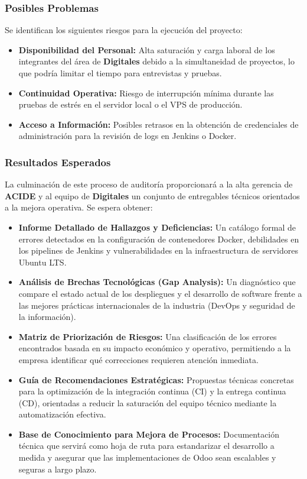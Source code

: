 \documentclass[12pt]{article}
\begin{document}
\subsubsection{Posibles Problemas}
Se identifican los siguientes riesgos para la ejecución del proyecto:
\begin{itemize}
    \item \textbf{Disponibilidad del Personal:} Alta saturación y carga laboral de los integrantes del área de \textbf{Digitales} debido a la simultaneidad de proyectos, lo que podría limitar el tiempo para entrevistas y pruebas.
    \item \textbf{Continuidad Operativa:} Riesgo de interrupción mínima durante las pruebas de estrés en el servidor local o el VPS de producción.
    \item \textbf{Acceso a Información:} Posibles retrasos en la obtención de credenciales de administración para la revisión de logs en Jenkins o Docker.
\end{itemize}

\subsubsection{Resultados Esperados}
La culminación de este proceso de auditoría proporcionará a la alta gerencia de \textbf{ACIDE} y al equipo de \textbf{Digitales} un conjunto de entregables técnicos orientados a la mejora operativa. Se espera obtener:
\begin{itemize}
    \item \textbf{Informe Detallado de Hallazgos y Deficiencias:} Un catálogo formal de errores detectados en la configuración de contenedores Docker, debilidades en los pipelines de Jenkins y vulnerabilidades en la infraestructura de servidores Ubuntu LTS.
    \item \textbf{Análisis de Brechas Tecnológicas (Gap Analysis):} Un diagnóstico que compare el estado actual de los despliegues y el desarrollo de software frente a las mejores prácticas internacionales de la industria (DevOps y seguridad de la información).
    \item \textbf{Matriz de Priorización de Riesgos:} Una clasificación de los errores encontrados basada en su impacto económico y operativo, permitiendo a la empresa identificar qué correcciones requieren atención inmediata.
    \item \textbf{Guía de Recomendaciones Estratégicas:} Propuestas técnicas concretas para la optimización de la integración continua (CI) y la entrega continua (CD), orientadas a reducir la saturación del equipo técnico mediante la automatización efectiva.
    \item \textbf{Base de Conocimiento para Mejora de Procesos:} Documentación técnica que servirá como hoja de ruta para estandarizar el desarrollo a medida y asegurar que las implementaciones de Odoo sean escalables y seguras a largo plazo.
\end{itemize}
\end{document}
